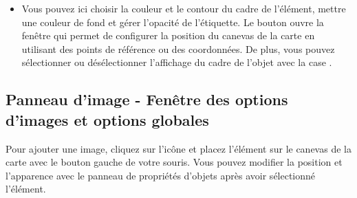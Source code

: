 \begin{itemize}[label=--]
\item Vous pouvez ici choisir la couleur et le contour du cadre de l'élément, mettre une couleur de fond et gérer l'opacité de l'étiquette. Le bouton  ouvre la fenêtre  qui permet de configurer la position du canevas de la carte en utilisant des points de référence ou des coordonnées. De plus, vous pouvez sélectionner ou désélectionner l'affichage du cadre de l'objet avec la case .
\end{itemize}

\subsection{Panneau d'image - Fenêtre des options d'images et options globales}

Pour ajouter une image, cliquez sur l'icône  et placez l'élément sur le canevas de la carte avec le bouton gauche de votre souris. Vous pouvez modifier la position et l'apparence avec le panneau de propriétés d'objets après avoir sélectionné l'élément.



